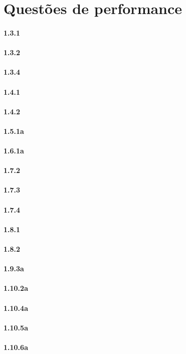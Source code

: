 \documentclass{article}
\begin{document}
\clearpage%
\section{Questões de performance}

\paragraph{1.3.1}
\paragraph{1.3.2}
\paragraph{1.3.4}
\paragraph{1.4.1}
\paragraph{1.4.2}
\paragraph{1.5.1a}
\paragraph{1.6.1a}
\paragraph{1.7.2}
\paragraph{1.7.3}
\paragraph{1.7.4}
\paragraph{1.8.1}
\paragraph{1.8.2}
\paragraph{1.9.3a}
\paragraph{1.10.2a}
\paragraph{1.10.4a}
\paragraph{1.10.5a}
\paragraph{1.10.6a}
\end{document}

